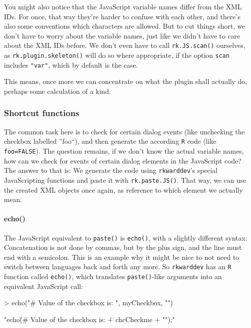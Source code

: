\documentclass[a4paper,10pt]{scrartcl}
\begin{document}
You might also notice that the JavaScript variable names differ from the XML IDs. For once, that way they're harder to confuse with each other,
and there's also some conventions which characters are allowed. But to cut things short, we don't have to worry about the variable names,
just like we didn't have to care about the XML IDs before. We don't even have to call \texttt{rk.JS.scan()} ourselves, as
\texttt{rk.plugin.skeleton()} will do so where appropriate, if the option \texttt{scan} includes \texttt{"var"}, which by default is the case.

This means, once more we can concentrate on what the plugin shall actually do, perhaps some calculation of a kind.

\subsubsection{Shortcut functions}
The common task here is to check for certain dialog events (like unchecking the checkbox labelled ''foo``), and then generate the according
\texttt{R} code (like \texttt{foo=FALSE}). The question remains, if we don't know the actual variable names, how can we check for events
of certain dialog elements in the JavaScript code? The answer to that is: We generate the code using \texttt{rkwarddev}'s special
JavaScripting functions and paste it with \texttt{rk.paste.JS()}. That way, we can use the created XML objects once again, as reference
to which element we actually mean.

\paragraph{echo()}
The JavaScript equivalent to \texttt{paste()} is \texttt{echo()}, with a slightly different
syntax: Concatenation is not done by commas, but by the plus sign, and the line must end with a semicolon. This is an example why it might be
nice to not need to switch between languages back and forth any more. So \texttt{rkwarddev} has an \texttt{R} function called \texttt{echo()},
which translates \texttt{paste()}-like arguments into an equivalent JavaScript call:

	\begin{Schunk}
		\begin{Sinput}
> echo("# Value of the checkbox is: ", myCheckbox, "\n")
		\end{Sinput}
		\begin{Soutput}
[1] "echo(\"# Value of the checkbox is: \" + chcCheckme + "\n");"
		\end{Soutput}
	\end{Schunk}
\end{document}
